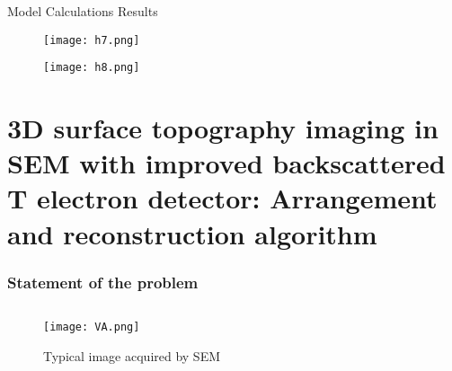 \documentclass{beamer}
\begin{document}
\begin{frame}[c, allowframebreaks]{Model Calculations Results}

    \begin{figure}[t]
        \texttt{[image: h7.png]}\label{fig:h7}
    \end{figure}

    \framebreak

    \begin{figure}
        \texttt{[image: h8.png]}\label{fig:h8}
    \end{figure}
\end{frame}



\section{3D surface topography imaging in SEM with improved backscattered T
electron detector: Arrangement and reconstruction algorithm}
\begin{frame}
    \sectionpage
\end{frame}

\begin{frame}[c]
    \frametitle{Statement of the problem}
    \begin{columns}
        \begin{column}{0.5\textwidth}
            \begin{figure}
                \texttt{[image: VA.png]}
                \caption{Typical image acquired by SEM}
            \end{figure}
        \end{column}
        \begin{column}{0.5\textwidth}
        \end{column}
    \end{columns}
\end{frame}
\end{document}
